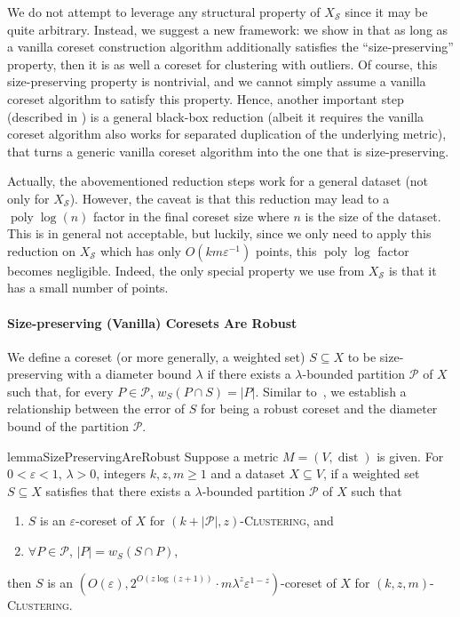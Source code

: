 \documentclass[letterpaper,11pt]{article}
\theoremstyle{plain}
\theoremstyle{definition}
\theoremstyle{remark}
\DeclareMathOperator{\poly}{poly}
\DeclareMathOperator{\dist}{dist}
\newcommand{\eps}{\varepsilon}
\renewcommand{\epsilon}{\varepsilon}
\newcommand{\calP}{\mathcal{P}}
\newcommand{\calS}{\mathcal{S}}
\newcommand{\ProblemName}[1]{\textsc{#1}}
\newcommand{\tzC}[1]{\ProblemName{$(#1,z)$-Clustering}\xspace}
\newcommand{\kzmC}{\ProblemName{$(k,z,m)$-Clustering}\xspace}
\begin{document}
We do not attempt to leverage any structural property of $X_{\calS}$ since it may be quite arbitrary.
Instead, we suggest a new framework:
we show in  that as long as a vanilla coreset construction algorithm additionally satisfies the ``size-preserving'' property,
then it is as well a coreset for clustering with outliers.
Of course, this size-preserving property is nontrivial, and we cannot simply assume a vanilla coreset algorithm to satisfy this property.
Hence, another important step (described in ) is a general black-box reduction (albeit it requires the vanilla coreset algorithm also works for separated duplication of the underlying metric),
that turns a generic vanilla coreset algorithm into the one that is size-preserving.

Actually, the abovementioned reduction steps work for a general dataset (not only for $X_{\calS}$).
However, the caveat is that this reduction may lead to a $\poly\log(n)$ factor in the final coreset size where $n$ is the size of the dataset.
This is in general not acceptable, but luckily, since we only need to apply this reduction on $X_{\calS}$ which has only $O(km\epsilon^{-1})$ points,
this $\poly\log$ factor becomes negligible.
Indeed, the only special property we use from $X_{\calS}$ is that it has a small number of points.

\paragraph{Size-preserving (Vanilla) Coresets Are Robust}
We define a coreset (or more generally, a weighted set) $S \subseteq X$ to be size-preserving with a diameter bound $\lambda$ if there exists a $\lambda$-bounded partition $\calP$ of $X$ such that, for every $P \in \calP$, $w_S(P \cap S) = |P|$. Similar to~, we establish a relationship between the error of $S$ for being a robust coreset and the diameter bound of the partition $\calP$.

\begin{restatable}{lemma}{SizePreservingAreRobust}
    \label{cor:second}
    Suppose a metric $M=(V,\dist)$ is given.
For $0<\eps<1$, $\lambda>0$, integers $k,z,m\ge 1$ and a dataset $X\subseteq V$, if a weighted set $S\subseteq X$ satisfies that there exists a $\lambda$-bounded partition $\calP$ of $X$ such that
    \begin{enumerate}
        \item $S$ is an $\eps$-coreset of $X$ for \tzC{k+|\calP| }, and 
        \item  $\forall P\in\calP$, $|P| = w_S(S\cap P)$,
    \end{enumerate}
    then $S$ is an $\left(O(\eps), 2^{O(z\log (z+1))}\cdot m\lambda^z\eps^{1-z}\right)$-coreset of $X$ for \kzmC.
\end{restatable}
\end{document}
